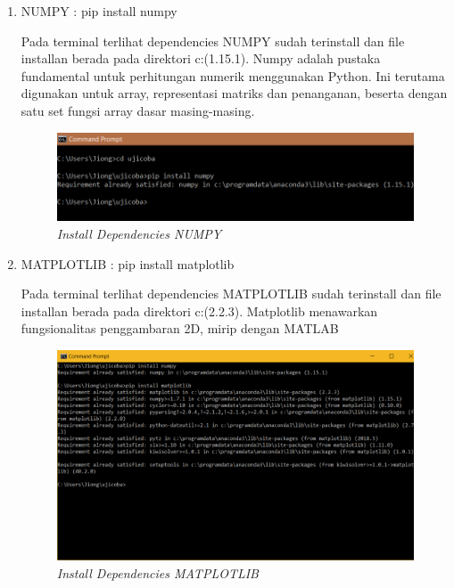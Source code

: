 \begin{enumerate}
    \item  NUMPY  : pip install numpy
    \par\hspace{1cm} Pada terminal terlihat dependencies NUMPY sudah terinstall dan file installan berada pada direktori c:\programdata{}\lib\sitepackages (1.15.1). Numpy adalah pustaka fundamental untuk perhitungan numerik menggunakan Python. Ini terutama digunakan untuk array,  representasi matriks dan penanganan, beserta dengan satu set fungsi array dasar masing-masing.
    
    \begin{figure} [htbp]
    \centering
    \includegraphics[scale=0.4] {figures/image011.png}
    \caption{\textit{ Install Dependencies NUMPY }}
    \end{figure}
  
    \item MATPLOTLIB  : pip install matplotlib
    \par\hspace{1cm}Pada terminal terlihat dependencies MATPLOTLIB sudah terinstall dan file installan berada pada direktori c:\programdata{}\lib\sitepackages (2.2.3). Matplotlib menawarkan fungsionalitas penggambaran 2D, mirip dengan MATLAB
    
    \begin{figure} [htbp]
    \centering
    \includegraphics[scale=0.3] {figures/image013.png}
    \caption{\textit{ Install Dependencies MATPLOTLIB  }}
    \end{figure}
  

\end{enumerate}
